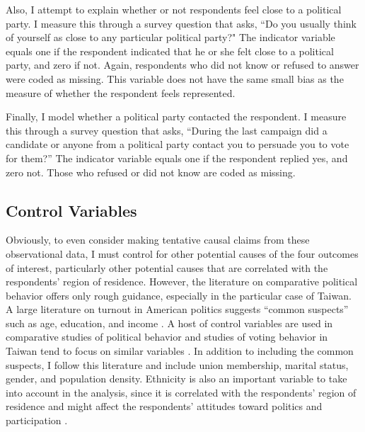 \documentclass[12pt]{article}
\begin{document}
Also, I attempt to explain whether or not respondents feel close to a political party. I measure this through a survey question that asks, ``Do you usually think of yourself as close to any particular political party?" The indicator variable equals one if the respondent indicated that he or she felt close to a political party, and zero if not. Again, respondents who did not know or refused to answer were coded as missing. This variable does not have the same small bias as the measure of whether the respondent feels represented.

Finally, I model whether a political party contacted the respondent. I measure this through a survey question that asks, ``During the last campaign did a candidate or anyone from a political party contact you to persuade you to vote for them?'' The indicator variable equals one if the respondent replied yes, and zero not. Those who refused or did not know are coded as missing.

\subsection*{Control Variables}

Obviously, to even consider making tentative causal claims from these observational data, I must control for other potential causes of the four outcomes of interest, particularly other potential causes that are correlated with the respondents' region of residence. However, the literature on comparative political behavior offers only rough guidance, especially in the particular case of Taiwan. A large literature on turnout in American politics suggests ``common suspects'' such as age, education, and income \citep{Campbelletal1960, RosenstoneHansen1993}. A host of control variables are used in comparative studies of political behavior \citep[e.g.][]{KarpBanducci2008, Blais2000} and studies of voting behavior in Taiwan tend to focus on similar variables \citep{HoWengClarke2015, Hoetal2013}. In addition to including the common suspects, I follow this literature and include union membership, marital status, gender, and population density. Ethnicity is also an important variable to take into account in the analysis, since it is correlated with the respondents' region of residence and might affect the respondents' attitudes toward politics and participation \citep{Hsieh2005, ChangWang2005, Chu2004}.
\end{document}
